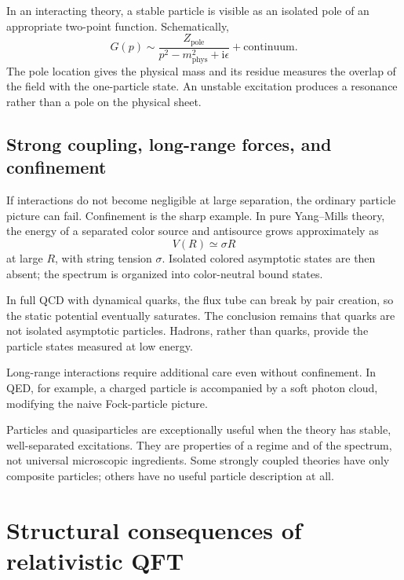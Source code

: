 \documentclass[11pt]{article}
\newcommand{\ii}{\mathrm{i}}
\begin{document}
In an interacting theory, a stable particle is visible as an isolated pole
of an appropriate two-point function.  Schematically,
\begin{equation}
  G(p)
  \sim\frac{Z_{\mathrm{pole}}}
  {p^2-m_{\mathrm{phys}}^2+\ii\epsilon}
  +\text{continuum}.
  \label{eq:particlepole}
\end{equation}
The pole location gives the physical mass and its residue measures the
overlap of the field with the one-particle state.  An unstable excitation
produces a resonance rather than a pole on the physical sheet.

\subsection{Strong coupling, long-range forces, and confinement}

If interactions do not become negligible at large separation, the ordinary
particle picture can fail.  Confinement is the sharp example.  In pure
Yang--Mills theory, the energy of a separated color source and antisource
grows approximately as
\begin{equation}
  V(R)\simeq \sigma R
\end{equation}
at large $R$, with string tension $\sigma$.  Isolated colored asymptotic
states are then absent; the spectrum is organized into color-neutral bound
states.

In full QCD with dynamical quarks, the flux tube can break by pair creation,
so the static potential eventually saturates.  The conclusion remains that
quarks are not isolated asymptotic particles.  Hadrons, rather than quarks,
provide the particle states measured at low energy.

Long-range interactions require additional care even without confinement.
In QED, for example, a charged particle is accompanied by a soft photon
cloud, modifying the naive Fock-particle picture.

\begin{keyidea}
Particles and quasiparticles are exceptionally useful when the theory has
stable, well-separated excitations.  They are properties of a regime and of
the spectrum, not universal microscopic ingredients.  Some strongly
coupled theories have only composite particles; others have no useful
particle description at all.
\end{keyidea}

\section{Structural consequences of relativistic QFT}
\end{document}
